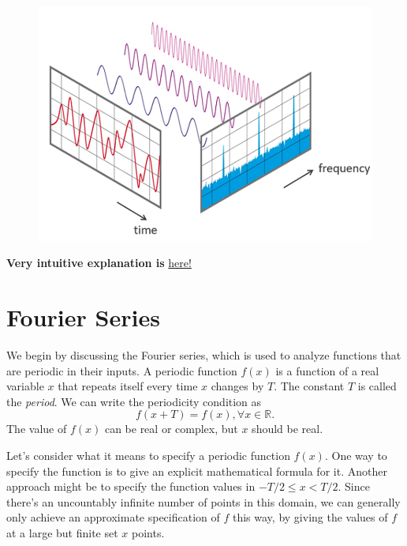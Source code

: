 \begin{figure}[h]
	\centering
	\includegraphics[scale=0.4]{./images/fourier/fourier_intuition.png}
\end{figure}
\textbf{Very intuitive explanation is} \href{https://devincody.github.io/Blog/post/an_intuitive_interpretation_of_the_fourier_transform/}{here!}



\section{Fourier Series}
\label{sec:fourier_series}

We begin by discussing the Fourier series, which is used to analyze functions that are periodic in their inputs. A periodic function $f(x)$ is a function of a real variable $x$ that repeats itself every time $x$ changes by $T$. The constant $T$ is called the \textit{period}. We can write the periodicity condition as
$$f(x+T) = f(x), \forall x\in \mathbb{R}.$$
The value of $f(x)$ can be real or complex, but $x$ should be real.

Let's consider what it means to specify a periodic function $f(x)$. One way to specify the function is to give an explicit mathematical formula for it. Another approach might be to specify the function values in $-T/2 \leq x < T/2$. Since there's an uncountably infinite number of points in this domain, we can generally only achieve an approximate specification of $f$ this way, by giving the values of $f$ at a large but finite set $x$ points. 

